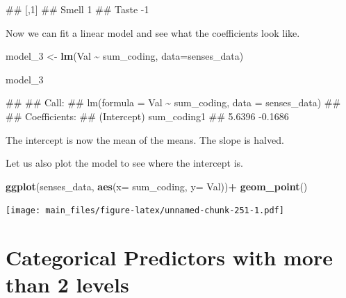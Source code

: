 \documentclass[
]{book}
\newenvironment{Shaded}{\begin{snugshade}}{\end{snugshade}}
\newcommand{\AttributeTok}[1]{\textcolor[rgb]{0.13,0.29,0.53}{#1}}
\newcommand{\FunctionTok}[1]{\textcolor[rgb]{0.13,0.29,0.53}{\textbf{#1}}}
\newcommand{\NormalTok}[1]{#1}
\newcommand{\OtherTok}[1]{\textcolor[rgb]{0.56,0.35,0.01}{#1}}
\newcommand{\SpecialCharTok}[1]{\textcolor[rgb]{0.81,0.36,0.00}{\textbf{#1}}}
\begin{document}
\begin{Shaded}
\begin{Highlighting}[]
\NormalTok{\#\#       [,1]}
\NormalTok{\#\# Smell    1}
\NormalTok{\#\# Taste   {-}1}
\end{Highlighting}
\end{Shaded}

Now we can fit a linear model and see what the coefficients look like.

\begin{Shaded}
\begin{Highlighting}[]
\NormalTok{model\_3 }\OtherTok{\textless{}{-}} \FunctionTok{lm}\NormalTok{(Val }\SpecialCharTok{\textasciitilde{}}\NormalTok{ sum\_coding, }\AttributeTok{data=}\NormalTok{senses\_data)}

\NormalTok{model\_3}
\end{Highlighting}
\end{Shaded}

\begin{Shaded}
\begin{Highlighting}[]
\NormalTok{\#\# }
\NormalTok{\#\# Call:}
\NormalTok{\#\# lm(formula = Val \textasciitilde{} sum\_coding, data = senses\_data)}
\NormalTok{\#\# }
\NormalTok{\#\# Coefficients:}
\NormalTok{\#\# (Intercept)  sum\_coding1  }
\NormalTok{\#\#      5.6396      {-}0.1686}
\end{Highlighting}
\end{Shaded}

The intercept is now the mean of the means. The slope is halved.

Let us also plot the model to see where the intercept is.

\begin{Shaded}
\begin{Highlighting}[]
\FunctionTok{ggplot}\NormalTok{(senses\_data, }\FunctionTok{aes}\NormalTok{(}\AttributeTok{x=}\NormalTok{ sum\_coding, }\AttributeTok{y=}\NormalTok{ Val))}\SpecialCharTok{+}
  \FunctionTok{geom\_point}\NormalTok{()}
\end{Highlighting}
\end{Shaded}

\texttt{[image: main\_files/figure-latex/unnamed-chunk-251-1.pdf]}

\hypertarget{categorical-predictors-with-more-than-2-levels}{%
\section{Categorical Predictors with more than 2 levels}\label{categorical-predictors-with-more-than-2-levels}}
\end{document}
